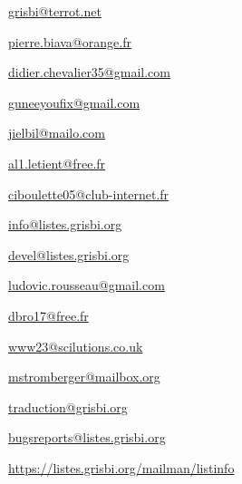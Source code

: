 \urldef{\urlFrancoisTerrotEmail}%
\url{grisbi@terrot.net}     %


\urldef{\urlPierreBiavaEmail}%
\url{pierre.biava@orange.fr}     %

\urldef{\urlDidierChevalierEmail}%
\url{didier.chevalier35@gmail.com}     %

\urldef{\urlWilliamOllivierEmail}%
\url{guneeyoufix@gmail.com}     %


\urldef{\urlJeanLucDuflotEmail}%
\url{jielbil@mailo.com}     %

\urldef{\urlAlainLetientEmail}%
\url{al1.letient@free.fr}     %


\urldef{\urlMicheleBondilEmail}%
\url{ciboulette05@club-internet.fr}     %

\urldef{\urlListInfoEmail}%
\url{info@listes.grisbi.org}     %

\urldef{\urlListDevelEmail}%
\url{devel@listes.grisbi.org}     %

\urldef{\urlLudovicRousseauEmail}%
\url{ludovic.rousseau@gmail.com}     %

\urldef{\urlDominiqueBrochardEmail}%
\url{dbro17@free.fr}     %

\urldef{\urlBobAndersonEmail}%
\url{www23@scilutions.co.uk}     %

\urldef{\urlMartinStrombergerEmail}%
\url{mstromberger@mailbox.org}     %

\urldef{\urlListTraductionEmail}%
\url{traduction@grisbi.org}  %

\urldef{\urlListBugsreport}%
\url{bugsreports@listes.grisbi.org}     %

\urldef{\urlListDiffGrisbi}%
\url{https://listes.grisbi.org/mailman/listinfo}     %
